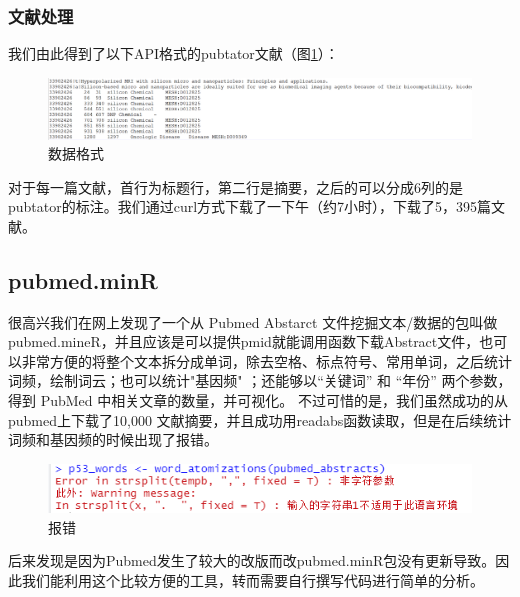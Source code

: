 \documentclass[12pt]{article}
\begin{document}
\subsubsection{文献处理}


我们由此得到了以下API格式的pubtator文献（图\ref{sss}）：
\begin{figure}[H]
  \centering
  \includegraphics[scale=0.40]{./picture/example.png} %
  \caption{数据格式} %
  \label{sss} %
\end{figure}	

对于每一篇文献，首行为标题行，第二行是摘要，之后的可以分成6列的是pubtator的标注。我们通过curl方式下载了一下午（约7小时），下载了5，395篇文献。
\subsection{pubmed.minR}
很高兴我们在网上发现了一个从 Pubmed Abstarct 文件挖掘文本/数据的包叫做pubmed.mineR\cite{2015pubmed}，并且应该是可以提供pmid就能调用函数下载Abstract文件，也可以非常方便的将整个文本拆分成单词，除去空格、标点符号、常用单词，之后统计词频，绘制词云；也可以统计"基因频" ；还能够以“关键词” 和 “年份” 两个参数，得到 PubMed 中相关文章的数量，并可视化。
不过可惜的是，我们虽然成功的从pubmed上下载了10,000 文献摘要，并且成功用readabs函数读取，但是在后续统计词频和基因频的时候出现了报错。
\begin{figure}[H]
  \centering
  \includegraphics[scale=0.9]{./picture/error.png} %
  \caption{报错} %
  \label{ssdd} %
\end{figure}	
后来发现是因为Pubmed发生了较大的改版而改pubmed.minR包没有更新导致。因此我们能利用这个比较方便的工具，转而需要自行撰写代码进行简单的分析。
\end{document}
